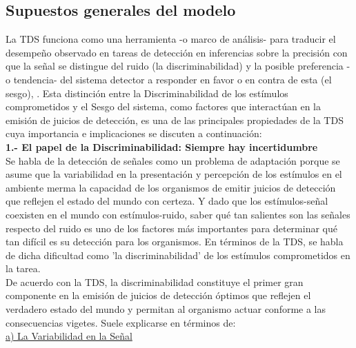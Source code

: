 \subsection{Supuestos generales del modelo}

La TDS funciona como una herramienta -o marco de análisis- para traducir el desempeño observado en tareas de detección en inferencias sobre la precisión con que la señal se distingue del ruido (la discriminabilidad) y la posible preferencia -o tendencia- del sistema detector a responder en favor o en contra de esta (el sesgo), \parencite{McNicol1}. Esta distinción entre la Discriminabilidad de los estímulos comprometidos y el Sesgo del sistema, como factores que interactúan en la emisión de juicios de detección, es una de las principales propiedades de la TDS cuya importancia e implicaciones se discuten a continuación:\\

\textbf{1.- El papel de la Discriminabilidad: Siempre hay incertidumbre}\\

Se habla de la detección de señales como un problema de adaptación porque se asume que la variabilidad en la presentación y percepción de los estímulos en el ambiente merma la capacidad de los organismos de emitir juicios de detección que reflejen el estado del mundo con certeza. Y dado que los estímulos-señal coexisten en el mundo con estímulos-ruido, saber qué tan salientes son las señales respecto del ruido es uno de los factores más importantes para determinar qué tan difícil es su detección para los organismos. En términos de la TDS, se habla de dicha dificultad como 'la discriminabilidad' de los estímulos comprometidos en la tarea.\\

De acuerdo con la TDS, la discriminabilidad constituye el primer gran componente en la emisión de juicios de detección óptimos que reflejen el verdadero estado del mundo y permitan al organismo actuar conforme a las consecuencias vigetes. Suele explicarse en términos de:\\ %

\underline{a) La Variabilidad en la Señal}\\


